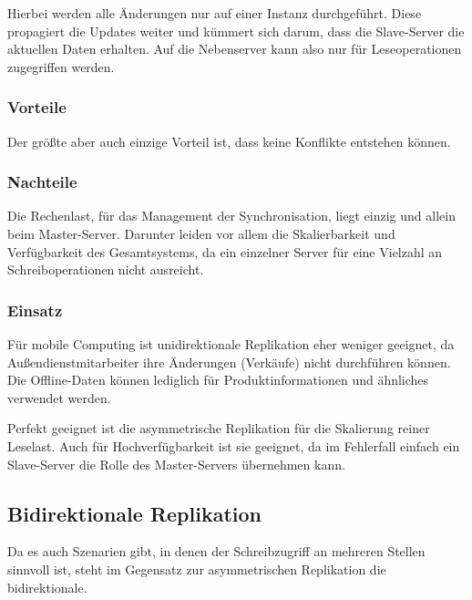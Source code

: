 Hierbei werden alle Änderungen nur auf einer Instanz durchgeführt. Diese propagiert die Updates weiter und kümmert sich darum, dass die Slave-Server die aktuellen Daten erhalten. Auf die Nebenserver kann also nur für Leseoperationen zugegriffen werden. \cite{leipzig}

\subsubsection{Vorteile}

Der größte aber auch einzige Vorteil ist, dass keine Konflikte entstehen können. \cite{leipzig}

\subsubsection{Nachteile}

Die Rechenlast, für das Management der Synchronisation, liegt einzig und allein beim Master-Server. Darunter leiden vor allem die Skalierbarkeit und Verfügbarkeit des Gesamtsystems, da ein einzelner Server für eine Vielzahl an Schreiboperationen nicht ausreicht. 

\subsubsection{Einsatz}

Für mobile Computing ist unidirektionale Replikation eher weniger geeignet, da Außendienstmitarbeiter ihre Änderungen (Verkäufe) nicht durchführen können. Die Offline-Daten können lediglich für Produktinformationen und ähnliches verwendet werden.

Perfekt geeignet ist die asymmetrische Replikation für die Skalierung reiner Leselast.  Auch für Hochverfügbarkeit ist sie geeignet, da im Fehlerfall einfach ein Slave-Server die Rolle des Master-Servers übernehmen kann.

\subsection{Bidirektionale Replikation}

Da es auch Szenarien gibt, in denen der Schreibzugriff an mehreren Stellen sinnvoll ist, steht im Gegensatz zur asymmetrischen Replikation die bidirektionale.

